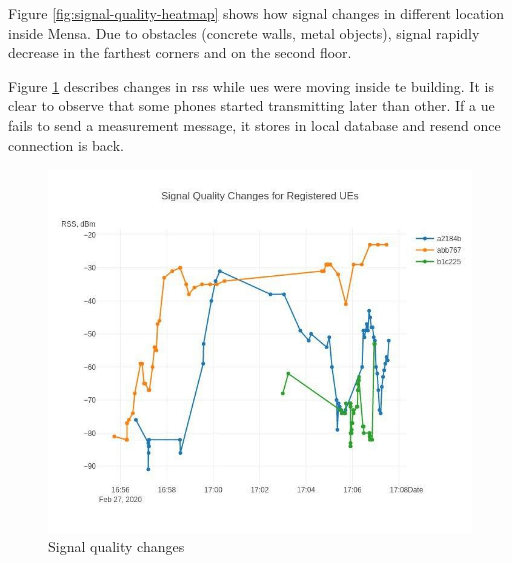 Figure \ref{fig:signal-quality-heatmap} shows how signal changes in different location inside Mensa. Due to obstacles (concrete walls, metal objects), signal rapidly decrease in the farthest corners and on the second floor.

Figure \ref{fig:signal-quality-changes} describes changes in \acrshort{rss} while \glspl{ue} were moving inside te building. It is clear to observe that some phones started transmitting later than other. If a \gls{ue} fails to send a measurement message, it stores in local database and resend once connection is back.


\begin{figure}[H]
	\centering
	\includegraphics[width=\linewidth,keepaspectratio]{images/experiment_3_3.jpg}
\caption{Signal quality changes}
\label{fig:signal-quality-changes}
\end{figure}
